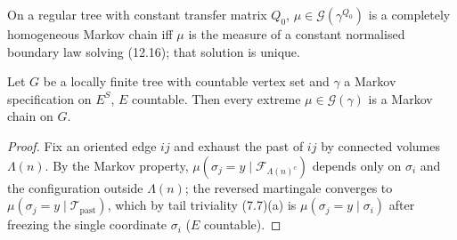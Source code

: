 \begin{theorem}
    \label{thm:tr-12-17}
    \leanok

    On a regular tree with constant transfer matrix $Q_0$, $\mu \in \mathcal G(\gamma^{Q_0})$ is
    a completely homogeneous Markov chain iff $\mu$ is the measure of a constant normalised
    boundary law solving (12.16); that solution is unique.
\end{theorem}

\begin{theorem}[Georgii (12.6)]
    \label{thm:tr-12-6}
    \leanok

    Let $G$ be a locally finite tree with countable vertex set and $\gamma$ a Markov
    specification on $E^S$, $E$ countable. Then every extreme $\mu \in \mathcal G(\gamma)$ is a
    Markov chain on $G$.
\end{theorem}
\begin{proof}
    \leanok
    Fix an oriented edge $ij$ and exhaust the past of $ij$ by connected volumes $\Lambda(n)$.
    By the Markov property, $\mu(\sigma_j = y \mid \mathcal F_{\Lambda(n)^c})$ depends only on
    $\sigma_i$ and the configuration outside $\Lambda(n)$; the reversed martingale converges
    to $\mu(\sigma_j = y \mid \mathcal T_{\mathrm{past}})$, which by tail triviality (7.7)(a) is
    $\mu(\sigma_j = y \mid \sigma_i)$ after freezing the single coordinate $\sigma_i$ ($E$ countable).
\end{proof}

